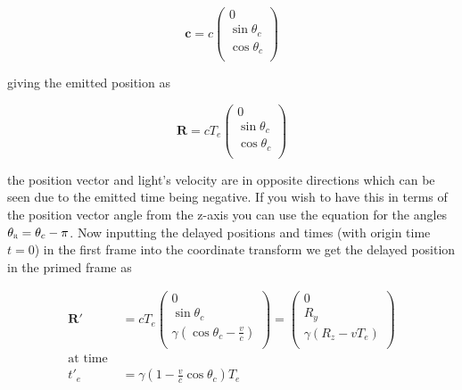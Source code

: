\begin{equation}
	\mathbf{c} = c
	\begin{pmatrix}
		0              \\
		\sin{\theta_c} \\
		\cos{\theta_c} \\
	\end{pmatrix}
\end{equation}

giving the emitted position as

\begin{equation}
	\mathbf{R} = c {T}_{e}
	\begin{pmatrix}
		0              \\
		\sin{\theta_c} \\
		\cos{\theta_c} \\
	\end{pmatrix}
\end{equation}

the position vector and light's velocity are in opposite directions which can be seen due to the emitted time being negative.
If you wish to have this in terms of the position vector angle from the z-axis you can use the equation for the angles $\theta_{\scalebox{0.5}{R}} = \theta_c - \pi$.
Now inputting the delayed positions and times (with origin time $t=0$) in the first frame into the coordinate transform we get the delayed position in the primed frame as

\begin{equation}
	\begin{aligned}
		\mathbf{R}{'}     & = c{T}_{e}
		\begin{pmatrix}
			0                                                    \\
			\sin{\theta_c}                                       \\
			{\gamma} \left( \cos{\theta_c} - \frac{v}{c} \right) \\
		\end{pmatrix}
		=
		\begin{pmatrix}
			0                                    \\
			{{R}_{y}}                                  \\
			{\gamma} \left( {{R}_{z}} - {v} {{T}_{e}} \right) \\
		\end{pmatrix}
		\\
		\text{at time } &
		\\ {{t}{'}_{e}} & = {\gamma} (1-\frac{v}{c} \cos{\theta_{c}} ) {{T}_{e}}
	\end{aligned}
\end{equation}

